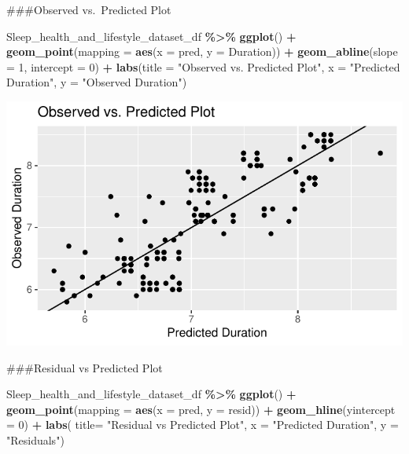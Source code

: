 \documentclass[
  11pt,
]{article}
\newenvironment{Shaded}{\begin{snugshade}}{\end{snugshade}}
\newcommand{\AttributeTok}[1]{\textcolor[rgb]{0.13,0.29,0.53}{#1}}
\newcommand{\DecValTok}[1]{\textcolor[rgb]{0.00,0.00,0.81}{#1}}
\newcommand{\FunctionTok}[1]{\textcolor[rgb]{0.13,0.29,0.53}{\textbf{#1}}}
\newcommand{\NormalTok}[1]{#1}
\newcommand{\SpecialCharTok}[1]{\textcolor[rgb]{0.81,0.36,0.00}{\textbf{#1}}}
\newcommand{\StringTok}[1]{\textcolor[rgb]{0.31,0.60,0.02}{#1}}
\begin{document}
\#\#\#Observed vs.~Predicted Plot

\begin{Shaded}
\begin{Highlighting}[]
\NormalTok{Sleep\_health\_and\_lifestyle\_dataset\_df }\SpecialCharTok{\%\textgreater{}\%}
  \FunctionTok{ggplot}\NormalTok{() }\SpecialCharTok{+}
  \FunctionTok{geom\_point}\NormalTok{(}\AttributeTok{mapping =} \FunctionTok{aes}\NormalTok{(}\AttributeTok{x =}\NormalTok{ pred, }\AttributeTok{y =}\NormalTok{ Duration)) }\SpecialCharTok{+}
  \FunctionTok{geom\_abline}\NormalTok{(}\AttributeTok{slope =} \DecValTok{1}\NormalTok{, }\AttributeTok{intercept =} \DecValTok{0}\NormalTok{) }\SpecialCharTok{+}
  \FunctionTok{labs}\NormalTok{(}\AttributeTok{title =} \StringTok{"Observed vs. Predicted Plot"}\NormalTok{, }\AttributeTok{x =} \StringTok{"Predicted Duration"}\NormalTok{, }\AttributeTok{y =} \StringTok{"Observed Duration"}\NormalTok{)}
\end{Highlighting}
\end{Shaded}

\begin{center}\includegraphics[width=0.7\linewidth]{SleepHelath_files/figure-latex/unnamed-chunk-35-1} \end{center}

\#\#\#Residual vs Predicted Plot

\begin{Shaded}
\begin{Highlighting}[]
\NormalTok{Sleep\_health\_and\_lifestyle\_dataset\_df }\SpecialCharTok{\%\textgreater{}\%}
  \FunctionTok{ggplot}\NormalTok{() }\SpecialCharTok{+}
  \FunctionTok{geom\_point}\NormalTok{(}\AttributeTok{mapping =} \FunctionTok{aes}\NormalTok{(}\AttributeTok{x =}\NormalTok{ pred, }\AttributeTok{y =}\NormalTok{ resid)) }\SpecialCharTok{+}
  \FunctionTok{geom\_hline}\NormalTok{(}\AttributeTok{yintercept =} \DecValTok{0}\NormalTok{) }\SpecialCharTok{+}
  \FunctionTok{labs}\NormalTok{( }\AttributeTok{title=} \StringTok{"Residual vs Predicted Plot"}\NormalTok{,}
        \AttributeTok{x =} \StringTok{"Predicted Duration"}\NormalTok{,}
        \AttributeTok{y =} \StringTok{"Residuals"}\NormalTok{)}
\end{Highlighting}
\end{Shaded}
\end{document}
